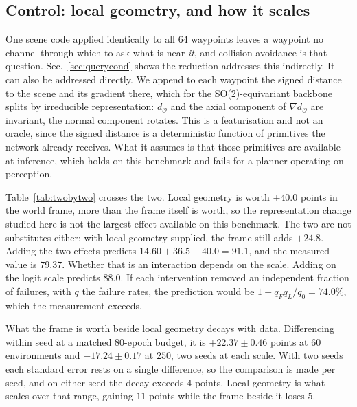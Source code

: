 \documentclass[conference]{IEEEtran}
\begin{document}
\subsection{Control: local geometry, and how it scales}
\label{sec:localgeom}
One scene code applied identically to all $64$ waypoints leaves a waypoint no
channel through which to ask what is near \emph{it}, and collision avoidance is
that question. Sec.~\ref{sec:querycond} shows the reduction addresses this
indirectly. It can also be addressed directly. We append to each waypoint the
signed distance to the scene and its gradient there, which for the SO(2)-equivariant backbone splits by irreducible representation: $d_{\mathcal{O}}$ and the axial
component of $\nabla d_{\mathcal{O}}$ are invariant, the normal component
rotates. This is a featurisation and not an oracle, since the signed distance is
a deterministic function of primitives the network already receives. What it
assumes is that those primitives are available at inference, which holds on this
benchmark and fails for a planner operating on perception.

Table~\ref{tab:twobytwo} crosses the two. Local geometry is worth $+40.0$ points
in the world frame, more than the frame itself is worth, so the representation
change studied here is not the largest effect available on this benchmark. The
two are not substitutes either: with local geometry supplied, the frame still
adds $+24.8$. Adding the two effects predicts $14.60 + 36.5 + 40.0 = 91.1$, and the
measured value is $79.37$. Whether that is an interaction depends on the scale.
Adding on the logit scale predicts $88.0$. If each intervention removed an
independent fraction of failures, with $q$ the failure rates, the prediction
would be $1 - q_F q_L / q_0 = 74.0\%$, which the measurement exceeds.

What the frame is worth beside local geometry decays with data. Differencing
within seed at a matched $80$-epoch budget, it is $+22.37 \pm 0.46$ points at
$60$ environments and $+17.24 \pm 0.17$ at $250$, two seeds at each scale. With two seeds each standard error rests on a single difference, so the
comparison is made per seed, and on either seed the decay exceeds $4$ points.
Local geometry is what scales over that range, gaining $11$ points while the
frame beside it loses $5$.
\end{document}
